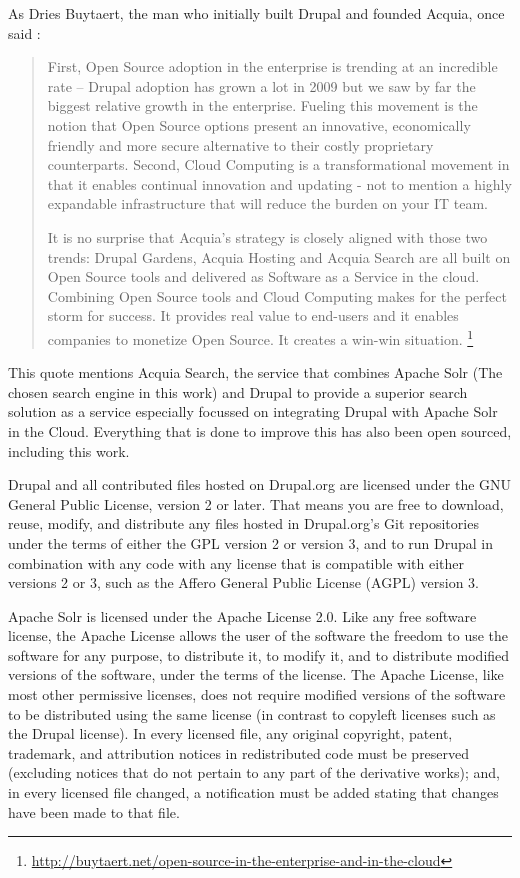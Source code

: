 As Dries Buytaert, the man who initially built Drupal and founded Acquia, once said : 
\begin{quote}First, Open Source adoption in the enterprise is trending at an incredible rate -- Drupal adoption has grown a lot in 2009 but we saw by far the biggest relative growth in the enterprise. Fueling this movement is the notion that Open Source options present an innovative, economically friendly and more secure alternative to their costly proprietary counterparts. Second, Cloud Computing is a transformational movement in that it enables continual innovation and updating - not to mention a highly expandable infrastructure that will reduce the burden on your IT team.

It is no surprise that Acquia's strategy is closely aligned with those two trends: Drupal Gardens, Acquia Hosting and Acquia Search are all built on Open Source tools and delivered as Software as a Service in the cloud. Combining Open Source tools and Cloud Computing makes for the perfect storm for success. It provides real value to end-users and it enables companies to monetize Open Source. It creates a win-win situation. \footnote{\url{http://buytaert.net/open-source-in-the-enterprise-and-in-the-cloud}} \end{quote}

This quote mentions Acquia Search, the service that combines Apache Solr (The chosen search engine in this work) and Drupal to provide a superior search solution as a service especially focussed on integrating Drupal with Apache Solr in the Cloud. Everything that is done to improve this has also been open sourced, including this work.

Drupal and all contributed files hosted on Drupal.org are licensed under the GNU General Public License, version 2 or later. That means you are free to download, reuse, modify, and distribute any files hosted in Drupal.org's Git repositories under the terms of either the GPL version 2 or version 3, and to run Drupal in combination with any code with any license that is compatible with either versions 2 or 3, such as the Affero General Public License (AGPL) version 3. \cite{drupal_license}

Apache Solr is licensed under the Apache License 2.0. Like any free software license, the Apache License allows the user of the software the freedom to use the software for any purpose, to distribute it, to modify it, and to distribute modified versions of the software, under the terms of the license. The Apache License, like most other permissive licenses, does not require modified versions of the software to be distributed using the same license (in contrast to copyleft licenses such as the Drupal license). In every licensed file, any original copyright, patent, trademark, and attribution notices in redistributed code must be preserved (excluding notices that do not pertain to any part of the derivative works); and, in every licensed file changed, a notification must be added stating that changes have been made to that file. \cite{apache_license}

